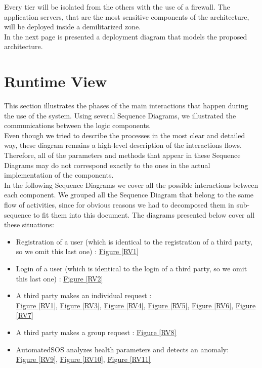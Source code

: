 \noindent Every tier will be isolated from the others with the use of a firewall. The application servers, that are the most sensitive components of the architecture, will be deployed inside a demilitarized zone.\\
In the next page is presented a deployment diagram that models the proposed architecture.
\begin{landscape}

\end{landscape}

\hypertarget{RV}{\section{Runtime View}}
This section illustrates the phases of the main interactions that happen during the use of the system. Using several Sequence Diagrams, we illustrated the communications between the logic components.\\
Even though we tried to describe the processes in the most clear and detailed way, these diagram remains a high-level description of the interactions flows. Therefore, all of the parameters and methods that appear in these Sequence Diagrams may do not correspond exactly to the ones in the actual implementation of the components.\\
In the following Sequence Diagrams we cover all the possible interactions between each component. We grouped all the Sequence Diagram that belong to the same flow of activities, since for obvious reasons we had to decomposed them in sub-sequence to fit them into this document.
The diagrams presented below cover all these situations:
\begin{itemize}
    \item Registration of a user (which is identical to the registration of a third party, so we omit this last one) : \underline{Figure \ref{RV1}}
    \item Login of a user (which is identical to the login of a third party, so we omit this last one) : \underline{Figure \ref{RV2}}
    \item A third party makes an individual request :\\ \underline{Figure \ref{RV1}}, \underline{Figure \ref{RV3}}, \underline{Figure \ref{RV4}}, \underline{Figure \ref{RV5}}, \underline{Figure \ref{RV6}}, \underline{Figure \ref{RV7}}
    \item A third party makes a group request :  \underline{Figure \ref{RV8}}
    \item AutomatedSOS analyzes health parameters and detects an anomaly:\\ \underline{Figure \ref{RV9}},  \underline{Figure \ref{RV10}},  \underline{Figure \ref{RV11}}
    
\end{itemize}


